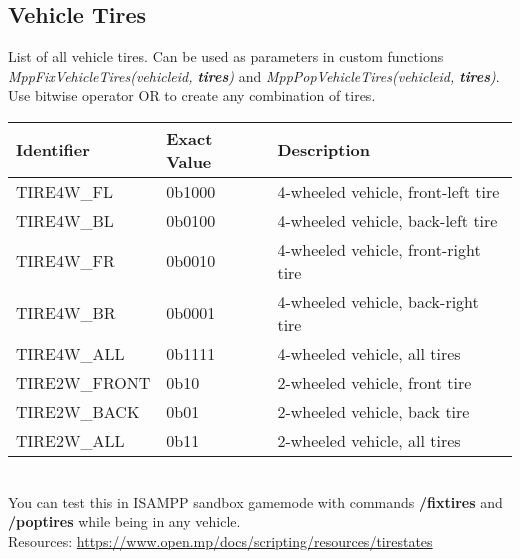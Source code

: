 \documentclass{article}
\begin{document}
\subsection{Vehicle Tires}
\begin{sloppypar}
List of all vehicle tires. Can be used as parameters in custom functions \textit{MppFixVehicleTires(vehicleid, \textbf{tires})} and \textit{MppPopVehicleTires(vehicleid, \textbf{tires})}. Use bitwise operator OR to create any combination of tires.
\end{sloppypar}
\bigskip
\noindent\begin{tabular}{ |l|l|l| } 
\hline
Identifier & Exact Value & Description \\
\hline
TIRE4W\_FL & 0b1000 & 4-wheeled vehicle, front-left tire \\ 
TIRE4W\_BL & 0b0100 & 4-wheeled vehicle, back-left tire \\ 
TIRE4W\_FR & 0b0010 & 4-wheeled vehicle, front-right tire \\ 
TIRE4W\_BR & 0b0001 & 4-wheeled vehicle, back-right tire \\ 
TIRE4W\_ALL & 0b1111 & 4-wheeled vehicle, all tires \\ 
TIRE2W\_FRONT & 0b10 & 2-wheeled vehicle, front tire \\ 
TIRE2W\_BACK & 0b01 & 2-wheeled vehicle, back tire \\ 
TIRE2W\_ALL & 0b11 & 2-wheeled vehicle, all tires \\ 
\hline
\end{tabular}
\bigskip
\\You can test this in ISAMPP sandbox gamemode with commands \textbf{/fixtires} and \textbf{/poptires} while being in any vehicle.
\bigskip
\\Resources: \url{https://www.open.mp/docs/scripting/resources/tirestates}


\newpage
\end{document}
